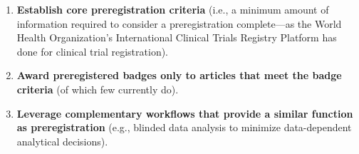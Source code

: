 \documentclass[authordate, meta, issue]{jote-new-article}
\begin{document}
\begin{fullwidth}
  \begin{enumerate}[leftmargin=!,itemindent=0pt]

    \item \textbf{Establish core preregistration criteria }(i.e., a minimum amount of information required to consider a preregistration complete—as the World Health Organization’s International Clinical Trials Registry Platform has done for clinical trial registration).


    \item \textbf{Award preregistered badges only to articles that meet the badge criteria }(of which few currently do).


    \item \textbf{Leverage complementary workflows that provide a similar function as preregistration }(e.g., blinded data analysis to minimize data-dependent analytical decisions).


  \end{enumerate}
\end{fullwidth}
\end{document}
